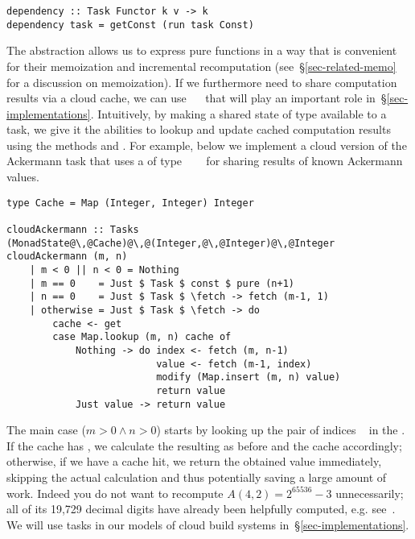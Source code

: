 \vspace{1mm}
\begin{verbatim}
dependency :: Task Functor k v -> k
dependency task = getConst (run task Const)
\end{verbatim}
\vspace{1mm}

\noindent
The  abstraction allows us to express pure functions in a way that
is convenient for their memoization and incremental recomputation
(see~\S\ref{sec-related-memo} for a discussion on memoization). If we
furthermore need to share computation results via a cloud cache, we can use
~~ that will
play an important role in~\S\ref{sec-implementations}. Intuitively, by making
a shared state of type  available to a task, we give it the abilities to
lookup and update cached computation results using the  methods
 and . For example, below we implement a cloud version of the
Ackermann task that uses a  of type
~~~ for sharing results of known
Ackermann values.

\vspace{1mm}
\begin{verbatim}
type Cache = Map (Integer, Integer) Integer

cloudAckermann :: Tasks (MonadState@\,@Cache)@\,@(Integer,@\,@Integer)@\,@Integer
cloudAckermann (m, n)
    | m < 0 || n < 0 = Nothing
    | m == 0    = Just $ Task $ const $ pure (n+1)
    | n == 0    = Just $ Task $ \fetch -> fetch (m-1, 1)
    | otherwise = Just $ Task $ \fetch -> do
        cache <- get
        case Map.lookup (m, n) cache of
            Nothing -> do index <- fetch (m, n-1)
                          value <- fetch (m-1, index)
                          modify (Map.insert (m, n) value)
                          return value
            Just value -> return value
\end{verbatim}
\vspace{1mm}

\noindent
The main case ($m>0 \wedge n>0$) starts by looking up the pair of indices
\hs{(}~ in the . If the cache has , we
calculate the resulting  as before and  the cache
accordingly; otherwise, if we have a cache hit, we return the obtained value
immediately, skipping the actual calculation and thus potentially saving a large
amount of work. Indeed you do not want to recompute $A(4,2)=2^{65536}-3$
unnecessarily; all of its 19,729 decimal digits have already been helpfully
computed, e.g. see~\cite{ackermann42}. We will use  tasks in our
models of cloud build systems in~\S\ref{sec-implementations}.
